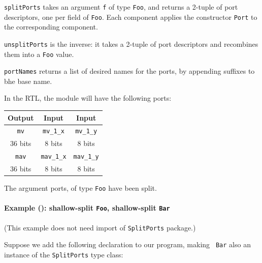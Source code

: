 {\tt splitPorts} takes an argument {\tt f} of type {\tt Foo}, and
returns a 2-tuple of port descriptors, one per field of {\tt Foo}.
Each component applies the constructor {\tt Port} to the corresponding
component.

{\tt unsplitPorts} is the inverse: it takes a 2-tuple of port
descriptors and recombines them into a {\tt Foo} value.

{\tt portNames} returns a list of desired names for the ports, by
appending suffixes to bhe base name.

In the RTL, the module will have the following ports:

\begin{center}
  \begin{tabular}{|c||c|c|}
    \hline
     Output &
     Input  &
     Input  \\
    \hline
     {\tt mv}       &
     {\tt mv\_1\_x} &
     {\tt mv\_1\_y} \\
     36 bits &
      8 bits &
      8 bits \\
    \hline
     {\tt mav}       &
     {\tt mav\_1\_x} &
     {\tt mav\_1\_y} \\
     36 bits &
      8 bits &
      8 bits \\
    \hline
  \end{tabular}
\end{center}

The argument ports, of type {\tt Foo} have been split.


\paragraph{Example (\BH): shallow-split {\tt Foo}, shallow-split {\tt Bar}}

\label{sec:splitports_examples_BH_Foo_Shallow_Bar_Shallow}

\hspace*{1em}

{\footnotesize (This example does not need import of {\tt SplitPorts} package.)}

Suppose we add the following declaration to our program, making {\tt
  Bar} also an instance of the {\tt SplitPorts} type class:

